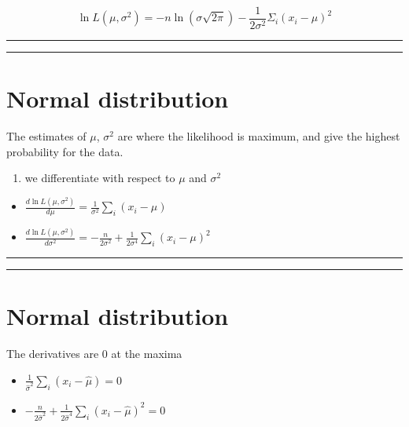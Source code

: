 \documentclass[
]{book}
\providecommand{\tightlist}{%
  \setlength{\itemsep}{0pt}\setlength{\parskip}{0pt}}
\begin{document}
\[\ln L(\mu, \sigma^2)=-n \ln(\sigma \sqrt{2 \pi})-\frac{1}{2\sigma^2} \Sigma_i(x_i-\mu)^2\]

\begin{center}\rule{0.5\linewidth}{0.5pt}\end{center}

\begin{center}\rule{0.5\linewidth}{0.5pt}\end{center}

\hypertarget{normal-distribution-11}{%
\section{Normal distribution}\label{normal-distribution-11}}

The estimates of \(\mu\), \(\sigma^2\) are where the likelihood is maximum, and give the highest probability for the data.

\begin{enumerate}
\def\labelenumi{\arabic{enumi}.}
\setcounter{enumi}{2}
\tightlist
\item
  we differentiate with respect to \(\mu\) and \(\sigma^2\)
\end{enumerate}

\begin{itemize}
\item
  \(\frac{d \ln L(\mu, \sigma^2)}{d\mu}=\frac{1}{\sigma^2} \sum_i(x_i-\mu)\)
\item
  \(\frac{d \ln L(\mu, \sigma^2)}{d\sigma^2}=-\frac{n}{2 \sigma^2}+\frac{1}{2\sigma^4} \sum_i(x_i-\mu)^2\)
\end{itemize}

\begin{center}\rule{0.5\linewidth}{0.5pt}\end{center}

\begin{center}\rule{0.5\linewidth}{0.5pt}\end{center}

\hypertarget{normal-distribution-12}{%
\section{Normal distribution}\label{normal-distribution-12}}

The derivatives are \(0\) at the maxima

\begin{itemize}
\tightlist
\item
  \(\frac{1}{\hat{\sigma}^2} \sum_i(x_i-\hat{\mu})=0\)
\item
  \(-\frac{n}{2 \hat{\sigma}^2}+\frac{1}{2\hat{\sigma}^4} \sum_i(x_i-\hat{\mu})^2=0\)
\end{itemize}
\end{document}
